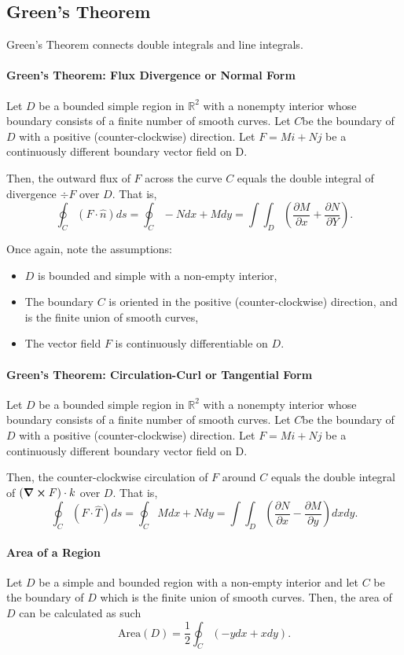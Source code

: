\subsection{Green's Theorem}
Green's Theorem connects double integrals and line integrals.


\paragraph{Green's Theorem: Flux Divergence or Normal Form}
Let \(D\) be a bounded simple region in \(\mathbb{R}^2\) with a nonempty interior
whose boundary consists of a finite number of smooth curves.
Let \(C\)be the boundary of \(D\) with a positive (counter-clockwise) direction.
Let \(F=Mi+Nj\) be a continuously different boundary vector field on D.

Then, the outward flux of \(F\) across the curve \(C\) equals the double
integral of divergence \(\div F\) over \(D\). That is,
\[
    \oint_C (F\cdot \hat{n})ds = \oint_C -Ndx + Mdy
    = \int\int_D  \left(\frac{\partial M}{\partial x} + \frac{\partial N}{\partial Y}\right).
\]

Once again, note the assumptions:
\begin{itemize}
    \item \(D\) is bounded and simple with a non-empty interior,
    \item The boundary \(C\) is oriented in the positive (counter-clockwise) direction,
    and is the finite union of smooth curves,
    \item The vector field \(F\) is continuously differentiable on \(D\).
\end{itemize}

\paragraph{Green's Theorem: Circulation-Curl or Tangential Form}
Let \(D\) be a bounded simple region in \(\mathbb{R}^2\) with a nonempty interior
whose boundary consists of a finite number of smooth curves.
Let \(C\)be the boundary of \(D\) with a positive (counter-clockwise) direction.
Let \(F=Mi+Nj\) be a continuously different boundary vector field on D.

Then, the counter-clockwise circulation of \(F\) around \(C\) equals the double
integral of \((\curl F)\cdot k\) over \(D\).
That is,
\[
    \oint_C (F\cdot \hat{T}) ds =      
    \oint_C Mdx + Ndy = 
    \int\int_D  \left(\frac{\partial N}{\partial x} - \frac{\partial M}{\partial y}\right) dx dy.
\]

\paragraph{Area of a Region}
Let \(D\) be a simple and bounded region with a non-empty interior and let \(C\)
be the boundary of \(D\) which is the finite union of smooth curves.
Then, the area of \(D\) can be calculated as such
\[
\text{Area}(D) = \frac{1}{2} \oint_C \left(-y dx + xdy\right).
\]
